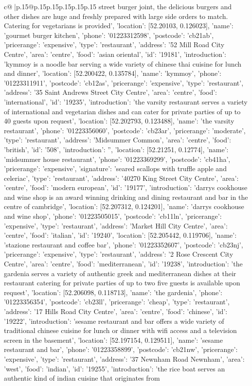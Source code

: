 \documentclass{article}
\begin{document}
{\begin{supertabular}{c@{$\;$}|p{.15\linewidth}@{}p{.15\linewidth}p{.15\linewidth}p{.15\linewidth}p{.15\linewidth}p{.15\linewidth}}
{{{street burger joint, the delicious burgers and other dishes are huge and freshly prepared with large side orders to match. Catering for vegetarians is provided', 'location': [52.20103, 0.126023], 'name': 'gourmet burger kitchen', 'phone': '01223312598', 'postcode': 'cb21ab', 'pricerange': 'expensive', 'type': 'restaurant'}, {'address': '52 Mill Road City Centre', 'area': 'centre', 'food': 'asian oriental', 'id': '19181', 'introduction': 'kymmoy is a noodle bar serving a wide variety of chinese thai cuisine for lunch and dinner', 'location': [52.200422, 0.135784], 'name': 'kymmoy', 'phone': '01223311911', 'postcode': 'cb12as', 'pricerange': 'expensive', 'type': 'restaurant'}, {'address': '35 Saint Andrews Street City Centre', 'area': 'centre', 'food': 'international', 'id': '19235', 'introduction': 'the varsity restaurant serves a variety of international and vegetarian dishes and can cater for private parties of up to 40 guests upon request', 'location': [52.202793, 0.123488], 'name': 'the varsity restaurant', 'phone': '01223356060', 'postcode': 'cb23ar', 'pricerange': 'moderate', 'type': 'restaurant'}, {'address': 'Midsummer Common', 'area': 'centre', 'food': 'british', 'id': '508', 'introduction': '', 'location': [52.21251, 0.12774], 'name': 'midsummer house restaurant', 'phone': '01223369299', 'postcode': 'cb41ha', 'pricerange': 'expensive', 'signature': 'seared scallops with truffle apple and celeriac', 'type': 'restaurant'}, {'address': '40270 King Street City Centre', 'area': 'centre', 'food': 'modern european', 'id': '19177', 'introduction': 'darrys cookhouse and wine shop is an award winning drinking and dining restaurant and bar in the centre of cambridge', 'location': [52.207312, 0.124201], 'name': 'darrys cookhouse and wine shop', 'phone': '01223505015', 'postcode': 'cb11ln', 'pricerange': 'expensive', 'type': 'restaurant'}, {'address': 'Market Hill City Centre', 'area': 'centre', 'food': 'italian', 'id': '19240', 'location': [52.205442, 0.119706], 'name': 'stazione restaurant and coffee bar', 'phone': '01223352607', 'postcode': 'cb23nj', 'pricerange': 'expensive', 'type': 'restaurant'}, {'address': '2 Rose Crescent City Centre', 'area': 'centre', 'food': 'mediterranean', 'id': '19238', 'introduction': 'the gardenia serves a variety of authentic greek and mediterranean dishes at their restaurant catering for private parties of up to two five guests is available upon request', 'location': [52.206098, 0.118713], 'name': 'the gardenia', 'phone': '01223356354', 'postcode': 'cb23ll', 'pricerange': 'cheap', 'type': 'restaurant'}, {'address': '17 Hills Road City Centre', 'area': 'centre', 'food': 'chinese', 'id': '19222', 'introduction': 'sesame restaurant and bar offers a wide variety of traditional chinese cuisine for lunch or dinner with wifi access and a television screen in the basement', 'location': [52.197154, 0.129511], 'name': 'sesame restaurant and bar', 'phone': '01223358899', 'postcode': 'cb21nw', 'pricerange': 'expensive', 'type': 'restaurant'}, {'address': '37 Newnham Road Newnham', 'area': 'west', 'food': 'indian', 'id': '19255', 'introduction': 'the rice boat serves an authentic kind of indian cuisine that originates from }}}
\end{supertabular}}
\end{document}
